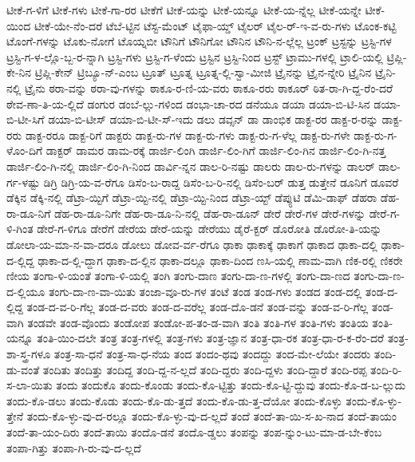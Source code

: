 {ಟೀಕೆ-ಗ-ಳಿಗೆ
ಟೀಕೆ-ಗಳು
ಟೀಕೆ-ಗಾ-ರರ
ಟೀಕೆಗೆ
ಟೀಕೆ-ಯನ್ನು
ಟೀಕೆ-ಯನ್ನೂ
ಟೀಕೆ-ಯ-ನ್ನೆಲ್ಲ
ಟೀಕೆ-ಯನ್ನೇ
ಟೀಕೆ-ಯಿಂದ
ಟೀಕೆ-ಯೇ-ನೆಂ-ದರೆ
ಟೆಬೆ-ಟ್ಟಿನ
ಟೆಸ್ಟ-ಮೆಂಟ್
ಟೈಫಾ-ಯ್ಡ್
ಟೈಲರ್
ಟೈಲ-ರ್-ಇ-ವ-ರು-ಗಳು
ಟೊಂಕ-ಕಟ್ಟಿ
ಟೊಂಗೆ-ಗಳನ್ನು
ಟೊಕು-ನೋಗೆ
ಟೊಯ್ನಬೀ
ಟೌನಿಗೆ
ಟೌನಿಗೋ
ಟೌನಿನ
ಟೌನಿ-ನ-ಲ್ಲೆಲ್ಲ
ಟ್ರಂಕ್
ಟ್ರಸ್ಟನ್ನು
ಟ್ರಸ್ಟಿ-ಗಳ
ಟ್ರಸ್ಟಿ-ಗ-ಳ-ಲ್ಲೊ-ಬ್ಬ-ರ-ನ್ನಾಗಿ
ಟ್ರಸ್ಟಿ-ಗಳು
ಟ್ರಸ್ಟಿ-ಗ-ಳೆಂದು
ಟ್ರಸ್ಟಿನ
ಟ್ರಸ್ಟಿ-ನಿಂದ
ಟ್ರಸ್ಟ್
ಟ್ರಾಮು-ಗಳಲ್ಲಿ
ಟ್ರಾಲಿ-ಯಲ್ಲಿ
ಟ್ರಿಪ್ಲಿ-ಕೇ-ನಿನ
ಟ್ರಿಪ್ಲಿ-ಕೇನ್
ಟ್ರಿಬ್ಯೂ-ನ್-ಎಂಬ
ಟ್ರೂತ್
ಟ್ರೂತ್ನ
ಟ್ರೂತ್ನ-ಲ್ಲಿ-ಸ್ವಾ-ಮೀಜಿ
ಟ್ರೈನನ್ನು
ಟ್ರೈನ-ನ್ನೇರಿ
ಟ್ರೈನಿನ
ಟ್ರೈನಿ-ನಲ್ಲಿ
ಟ್ರೈನು
ಠರಾ-ವನ್ನು
ಠರಾ-ವು-ಗಳನ್ನು
ಠಾಕೂ-ರ-ಣಿ-ಯ-ವರು
ಠಾಕೂ-ರರು
ಠಾಕೂರ್
ಠಿತ-ರಾ-ಗಿ-ದ್ದ-ರೆಂ-ದರೆ
ಠೇವ-ಣಾ-ತಿ-ಯ-ಲ್ಲಿದೆ
ಡಂಗುರ
ಡಂಬೆ-ಲ್ಲು-ಗಳಿಂದ
ಡಂಭಾ-ಚಾ-ರದ
ಡನೆಯೂ
ಡಯಾ
ಡಯಾ-ಬಿ-ಟಿ-ಸಿನ
ಡಯಾ-ಬಿ-ಟೀ-ಸಿಗೆ
ಡಯಾ-ಬಿ-ಟೀಸ್
ಡಯಾ-ಬಿ-ಟೀ-ಸ್-ಇದು
ಡಲು
ಡವ್ಸನ್
ಡಾ
ಡಾಂಭಿಕ
ಡಾಕ್ಟ-ರರ
ಡಾಕ್ಟ-ರ-ರನ್ನು
ಡಾಕ್ಟ-ರರು
ಡಾಕ್ಟ-ರರೂ
ಡಾಕ್ಟ-ರಿಗೆ
ಡಾಕ್ಟರು
ಡಾಕ್ಟ-ರು-ಗಳ
ಡಾಕ್ಟ-ರು-ಗಳು
ಡಾಕ್ಟ-ರು-ಗ-ಳೆಲ್ಲ
ಡಾಕ್ಟ-ರು-ಗಳೇ
ಡಾಕ್ಟ-ರು-ಗ-ಳೊಂ-ದಿಗೆ
ಡಾಕ್ಟರ್
ಡಾಮರ
ಡಾಮ-ರಕ್ಕೆ
ಡಾರ್ಜಿ-ಲಿಂಗಿ
ಡಾರ್ಜಿ-ಲಿಂ-ಗಿಗೆ
ಡಾರ್ಜಿ-ಲಿಂ-ಗಿನ
ಡಾರ್ಜಿ-ಲಿಂ-ಗಿ-ನತ್ತ
ಡಾರ್ಜಿ-ಲಿಂ-ಗಿ-ನಲ್ಲಿ
ಡಾರ್ಜಿ-ಲಿಂ-ಗಿ-ನಿಂದ
ಡಾರ್ವಿ-ನ್ನನ
ಡಾಲ-ರಿ-ನಷ್ಟು
ಡಾಲರು
ಡಾಲ-ರು-ಗಳನ್ನು
ಡಾಲರ್
ಡಾಲ-ರ್ಗ-ಳಷ್ಟು
ಡಿಗ್ರಿ
ಡಿಗ್ರಿ-ಯ-ವ-ರೆಗೂ
ಡಿಸೆಂ-ಬ-ರಾದ್ದ
ಡಿಸೆಂ-ಬ-ರಿ-ನಲ್ಲಿ
ಡಿಸೆಂ-ಬರ್
ಡುತ್ತ
ಡುತ್ತೇನೆ
ಡೂನಿಗೆ
ಡೂವರೆ
ಡೆಕ್ಕಿನ
ಡೆಕ್ಕಿ-ನಲ್ಲಿ
ಡೆಟ್ರಾ-ಯ್ಟಿಗೆ
ಡೆಟ್ರಾ-ಯ್ಟಿ-ನಲ್ಲಿ
ಡೆಟ್ರಾ-ಯ್ಟಿ-ನಿಂದ
ಡೆಟ್ರಾ-ಯ್ಟ್
ಡೆಪ್ಯುಟಿ
ಡೆಮಿ-ಡಾಫ್
ಡೆಹರಾ
ಡೆಹ-ರಾ-ಡೂ-ನಿಗೆ
ಡೆಹ-ರಾ-ಡೂ-ನಿಗೇ
ಡೆಹ-ರಾ-ಡೂ-ನಿ-ನಲ್ಲಿ
ಡೆಹ-ರಾ-ಡೂನ್
ಡೇರೆ
ಡೇರೆ-ಗಳ
ಡೇರೆ-ಗಳನ್ನು
ಡೇರೆ-ಗ-ಳಿ-ಗಿಂತ
ಡೇರೆ-ಗ-ಳಿಗೂ
ಡೇರೆಗೆ
ಡೇರೆಯ
ಡೇರೆ-ಯನ್ನು
ಡೇರೆಯು
ಡೈರೆ-ಕ್ಟರ್
ಡೊರೋತಿ
ಡೊರೋ-ತಿ-ಯನ್ನು
ಡೋಲಾ-ಯ-ಮಾ-ನ-ವಾ-ದರೂ
ಡೋಲು
ಡೋವ-ರ್ವ-ರೆಗೂ
ಢಾಕಾ
ಢಾಕಾಕ್ಕೆ
ಢಾಕಾಗೆ
ಢಾಕಾದ
ಢಾಕಾ-ದಲ್ಲಿ
ಢಾಕಾ-ದ-ಲ್ಲಿದ್ದ
ಢಾಕಾ-ದ-ಲ್ಲಿ-ದ್ದಾಗ
ಢಾಕಾ-ದ-ಲ್ಲಿನ
ಢಾಕಾ-ದಲ್ಲೂ
ಢಾಕಾ-ದಿಂದ
ಣಸಿ-ಯಲ್ಲಿ
ಣಾಮ-ವಾಗಿ
ಣಿಕ-ರಲ್ಲಿ
ಣಿಕರೇ
ಣೀಯ
ತಂಗಾ-ಳಿ-ಯಂತೆ
ತಂಗಾ-ಳಿ-ಯಲ್ಲಿ
ತಂಗಿ
ತಂಗು-ದಾಣ
ತಂಗು-ದಾ-ಣ-ಗಳಲ್ಲಿ
ತಂಗು-ದಾ-ಣದ
ತಂಗು-ದಾ-ಣ-ದ-ಲ್ಲಿಯೂ
ತಂಗು-ದಾ-ಣ-ವಾ-ಯಿತು
ತಂಜಾ-ವೂ-ರು-ಗಳ
ತಂಟೆ
ತಂಡ
ತಂಡ-ಗಳು
ತಂಡದ
ತಂಡ-ದಲ್ಲಿ
ತಂಡ-ದ-ಲ್ಲಿದ್ದ
ತಂಡ-ದ-ವ-ರಿ-ಗೆಲ್ಲ
ತಂಡ-ದ-ವರು
ತಂಡ-ದ-ವರೆಲ್ಲ
ತಂಡ-ದೊ-ಡನೆ
ತಂಡ-ವನ್ನು
ತಂಡ-ವ-ರಿ-ಗೆಲ್ಲ
ತಂಡ-ವಾಗಿ
ತಂಡವೇ
ತಂಡ-ವೊಂದು
ತಂಡೋಪ
ತಂಡೋ-ಪ-ತಂ-ಡ-ವಾಗಿ
ತಂತಿ
ತಂತಿ-ಗಳ
ತಂತಿ-ಗಳು
ತಂತಿಯ
ತಂತಿ-ಯನ್ನೂ
ತಂತಿ-ಯಿಂ-ದಲೇ
ತಂತ್ರ
ತಂತ್ರ-ಗಳಲ್ಲಿ
ತಂತ್ರ-ಗಳು
ತಂತ್ರ-ಜ್ಞಾನ
ತಂತ್ರ-ಧಾ-ರಕ
ತಂತ್ರ-ಧಾ-ರ-ಕ-ರೆಂ-ದರೆ
ತಂತ್ರ-ಶಾ-ಸ್ತ್ರ-ಗಳೂ
ತಂತ್ರ-ಸಾ-ಧನೆ
ತಂತ್ರ-ಸಾ-ಧ-ನೆಯ
ತಂದ
ತಂದಂ-ಥವು
ತಂದದ್ದು
ತಂದ-ಮೇ-ಲೆಯೇ
ತಂದರು
ತಂದಿ-ಡು-ವಂತೆ
ತಂದಿತು
ತಂದಿತ್ತು
ತಂದಿದ್ದ
ತಂದಿ-ದ್ದ-ನ-ಲ್ಲದೆ
ತಂದಿ-ದ್ದರು
ತಂದಿ-ದ್ದಳು
ತಂದಿ-ದ್ದಾರೆ
ತಂದಿ-ರಪ್ಪ
ತಂದಿ-ರಿ-ಸ-ಲಾ-ಯಿತು
ತಂದು
ತಂದುಕೊ
ತಂದು-ಕೊಂಡು
ತಂದು-ಕೊ-ಟ್ಟಿತ್ತು
ತಂದು-ಕೊ-ಟ್ಟಿ-ದ್ದುವು
ತಂದು-ಕೊ-ಡ-ಬ-ಲ್ಲುದು
ತಂದು-ಕೊ-ಡಲು
ತಂದು-ಕೊಡು
ತಂದು-ಕೊ-ಡು-ತ್ತದೆ
ತಂದು-ಕೊ-ಡು-ತ್ತ-ದೆಯೋ
ತಂದು-ಕೊಳ್ಳು
ತಂದು-ಕೊ-ಳ್ಳು-ತ್ತೇನೆ
ತಂದು-ಕೊ-ಳ್ಳು-ವು-ದ-ರಲ್ಲೂ
ತಂದು-ಕೊ-ಳ್ಳು-ವು-ದ-ಲ್ಲದೆ
ತಂದೆ
ತಂದೆ-ತಾ-ಯಿ-ಸ-ಖ-ನಾದ
ತಂದೆ-ತಾಯಂ
ತಂದೆ-ತಾ-ಯಂ-ದಿರು
ತಂದೆ-ತಾಯಿ
ತಂದೊ-ಡನೆ
ತಂದೊ-ಡ್ಡಲು
ತಂಪನ್ನು
ತಂಪ-ನ್ನುಂ-ಟು-ಮಾ-ಡ-ಬೇ-ಕೆಂಬ
ತಂಪಾ-ಗಿತ್ತು
ತಂಪಾ-ಗಿ-ರು-ವು-ದ-ಲ್ಲದೆ
}
